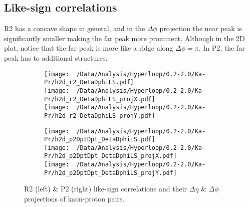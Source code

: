 \documentclass[12pt,a4paper,twoside]{report}
\begin{document}
\subsection{Like-sign correlations}
R2 has a concave shape in general, and in the $\Delta\phi$ projection the near peak is significantly smaller making the far peak more prominent. Although in the 2D plot, notice that the far peak is more like a ridge along $\Delta\phi=\pi$. In P2, the far peak has to additional structures.
\begin{figure}[H]
	\begin{subfigure}{0.49\linewidth}
		\texttt{[image: ~/Data/Analysis/Hyperloop/0.2-2.0/Ka-Pr/h2d\_r2\_DetaDphiLS.pdf]}\\
		\texttt{[image: ~/Data/Analysis/Hyperloop/0.2-2.0/Ka-Pr/h2d\_r2\_DetaDphiLS\_projX.pdf]}\\
		\texttt{[image: ~/Data/Analysis/Hyperloop/0.2-2.0/Ka-Pr/h2d\_r2\_DetaDphiLS\_projY.pdf]}\\
	\end{subfigure}
	\begin{subfigure}{0.49\linewidth}
		\texttt{[image: ~/Data/Analysis/Hyperloop/0.2-2.0/Ka-Pr/h2d\_p2DptDpt\_DetaDphiLS.pdf]}\\
		\texttt{[image: ~/Data/Analysis/Hyperloop/0.2-2.0/Ka-Pr/h2d\_p2DptDpt\_DetaDphiLS\_projX.pdf]}\\
		\texttt{[image: ~/Data/Analysis/Hyperloop/0.2-2.0/Ka-Pr/h2d\_p2DptDpt\_DetaDphiLS\_projY.pdf]}\\
	\end{subfigure}
	\caption{R2 (left) \& P2 (right) like-sign correlations and their $\Delta\eta$ \& $\Delta\phi$ projections of kaon-proton pairs.}
\end{figure}
\end{document}
